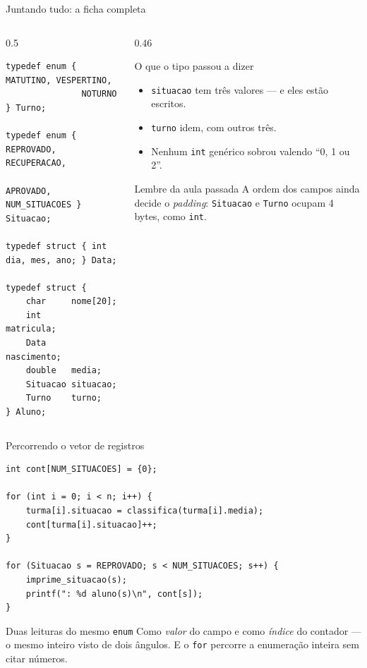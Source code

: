 \documentclass[aspectratio=169]{beamer}
\begin{document}
\begin{frame}[fragile]{Juntando tudo: a ficha completa}
\begin{columns}[T]
\begin{column}{0.5\textwidth}
\begin{lstlisting}[basicstyle=\ttfamily\tiny]
typedef enum { MATUTINO, VESPERTINO,
               NOTURNO } Turno;

typedef enum { REPROVADO, RECUPERACAO,
               APROVADO, NUM_SITUACOES } Situacao;

typedef struct { int dia, mes, ano; } Data;

typedef struct {
    char     nome[20];
    int      matricula;
    Data     nascimento;
    double   media;
    Situacao situacao;
    Turno    turno;
} Aluno;
\end{lstlisting}
\end{column}
\begin{column}{0.46\textwidth}
\begin{block}{O que o tipo passou a dizer}
  \begin{itemize}
    \item \texttt{situacao} tem três valores --- e eles estão escritos.
    \item \texttt{turno} idem, com outros três.
    \item Nenhum \texttt{int} genérico sobrou valendo ``0, 1 ou 2''.
  \end{itemize}
\end{block}
\begin{exampleblock}{Lembre da aula passada}
  A ordem dos campos ainda decide o \emph{padding}: \texttt{Situacao} e
  \texttt{Turno} ocupam 4 bytes, como \texttt{int}.
\end{exampleblock}
\end{column}
\end{columns}
\end{frame}

\begin{frame}[fragile]{Percorrendo o vetor de registros}
\begin{lstlisting}[basicstyle=\ttfamily\scriptsize]
int cont[NUM_SITUACOES] = {0};

for (int i = 0; i < n; i++) {
    turma[i].situacao = classifica(turma[i].media);
    cont[turma[i].situacao]++;
}

for (Situacao s = REPROVADO; s < NUM_SITUACOES; s++) {
    imprime_situacao(s);
    printf(": %d aluno(s)\n", cont[s]);
}
\end{lstlisting}
  \begin{block}{Duas leituras do mesmo \texttt{enum}}
    Como \emph{valor} do campo e como \emph{índice} do contador --- o mesmo
    inteiro visto de dois ângulos. E o \texttt{for} percorre a enumeração
    inteira sem citar números.
  \end{block}
\end{frame}
\end{document}
